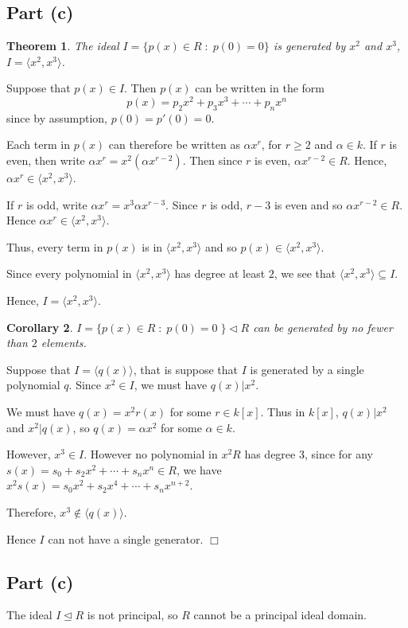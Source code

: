 \documentclass[10pt]{article}
\newtheorem{theorem}{Theorem}
\newtheorem{corollary}[theorem]{Corollary}
\newenvironment{proof}[1][Proof]{\begin{trivlist}
\item[\hskip \labelsep {\bfseries #1}]}{\end{trivlist}}
\begin{document}
    \subsection*{Part (c)}
    \begin{theorem}
        The ideal $I = \{p(x) \in R\;:\;p(0) = 0\}$
        is generated by $x^2$ and $x^3$, $I = \langle x^2,x^3\rangle$.
    \end{theorem}
    \begin{proof}
        Suppose that $p(x) \in I$. Then $p(x)$ can be written in the form
        \begin{equation*}
            p(x) = p_2 x^2+p_3x^3+\cdots+p_nx^n
        \end{equation*}
        since by assumption, $p(0) = p'(0) = 0$.
        
        Each term in $p(x)$ can therefore be written as $\alpha x^r$, for $r \geq 2$
        and $\alpha  \in k$. If $r$ is even, then write $\alpha x^r = x^2(\alpha x^{r-2})$.
        Then since $r$ is even, $\alpha x^{r-2} \in R$. Hence, $\alpha x^r \in \langle x^2,x^3\rangle$.
        
        If $r$ is odd, write $\alpha x^r = x^3\alpha x^{r-3}$. Since $r$ is odd, $r-3$ is even
        and so $\alpha x^{r-2} \in R$. Hence $\alpha x^r \in \langle x^2,x^3\rangle$.
        
        Thus, every term in $p(x)$ is in $\langle x^2, x^3\rangle$ and so $p(x) \in \langle x^2, x^3\rangle$.
        
        Since every polynomial in $\langle x^2, x^3\rangle$ has degree at least $2$, we
        see that $\langle x^2, x^3\rangle \subseteq I$.
        
        Hence, $I = \langle x^2,x^3\rangle$.
    \end{proof}
        
    \begin{corollary}
        $I = \{p(x)\in R\;:\;p(0) = 0\;\} \lhd R$ can be generated by no fewer
        than $2$ elements.
    \end{corollary}
    \begin{proof}
        Suppose that $I = \langle q(x)\rangle$, that is suppose that $I$ is generated
        by a single polynomial $q$. Since $x^2 \in I$, we must have $q(x)|x^2$.
        
        We must have $q(x) = x^2r(x)$ for some $r \in k[x]$. Thus
        in $k[x]$, $q(x)|x^2$ and $x^2|q(x)$, so $q(x) = \alpha x^2$ for some $\alpha \in k$.
        
        However, $x^3 \in I$. However no polynomial in $x^2R$ has degree $3$, since 
        for any $s(x) = s_0+s_2x^2+\cdots+s_nx^n\in R$, we have $x^2s(x) = s_0x^2+s_2x^4+\cdots+s_nx^{n+2}$.
        
        Therefore, $x^3 \notin \langle q(x)\rangle$. 
        
        Hence $I$ can not have a single generator. $\Box$
    \end{proof}
\subsection*{Part (c)}
    The ideal $I\unlhd R$ is not principal, so $R$ cannot be a principal ideal domain.

    
    
\end{document}
